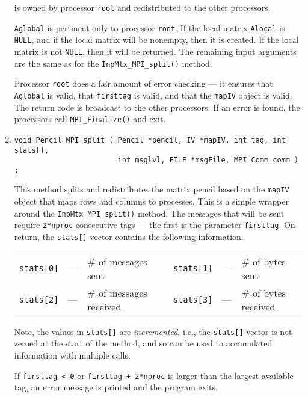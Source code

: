 \begin{enumerate}
is owned by processor {\tt root} and redistributed to the other
processors.
\par
{\tt  Aglobal} is pertinent only to processor {\tt root}.
If the local matrix {\tt Alocal} is {\tt  NULL}, and if the local matrix
will be nonempty, then it is created.
If the local matrix is not {\tt NULL}, then it will be returned.
The remaining input arguments are the same as for the 
{\tt InpMtx\_MPI\_split()} method.
\par {}
Processor {\tt root} does a fair amount of error checking --- it ensures
that {\tt Aglobal} is valid, that {\tt firsttag} is valid, and that the
{\tt mapIV} object is valid.
The return code is broadcast to the other processors.
If an error is found, the processors call {\tt MPI\_Finalize()} and
exit.
\item
\begin{verbatim}
void Pencil_MPI_split ( Pencil *pencil, IV *mapIV, int tag, int stats[],
                        int msglvl, FILE *msgFile, MPI_Comm comm ) ;
\end{verbatim}
This method splits and redistributes the matrix pencil based on the
{\tt mapIV} object that maps rows and columns to processes.
This is a simple wrapper around the {\tt InpMtx\_MPI\_split()} method.
The messages that will be sent require {\tt 2*nproc} consecutive tags
--- the first is the parameter {\tt firsttag}.
On return, the {\tt stats[]} vector contains the following
information.
\par
\begin{center}
\begin{tabular}{cclcccl}
{\tt stats[0]} & --- & \# of messages sent 
& &
{\tt stats[1]} & --- & \# of bytes sent \\
{\tt stats[2]} & --- & \# of messages received 
& &
{\tt stats[3]} & --- & \# of bytes received 
\end{tabular}
\end{center}
\par
Note, the values in {\tt stats[]} are {\it incremented}, i.e.,
the {\tt stats[]} vector is not zeroed at the start of the method,
and so can be used to accumulated information with multiple calls.
\par {}
If {\tt firsttag < 0} or {\tt firsttag + 2*nproc} 
is larger than the largest available tag,
an error message is printed and the program exits.

\end{enumerate}
